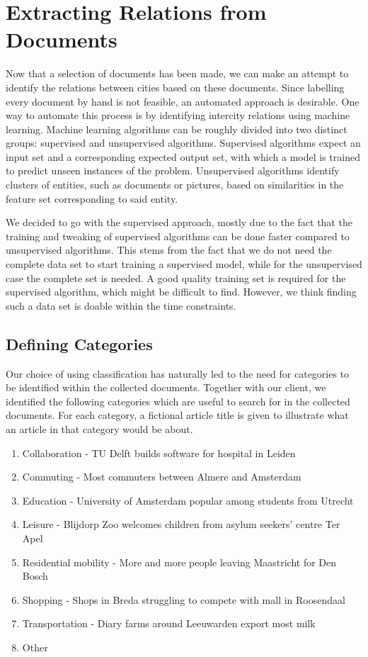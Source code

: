 \section{Extracting Relations from Documents}\label{sec:classification-design}
Now that a selection of documents has been made, we can make an attempt to identify the relations between cities based on these documents. Since labelling every document by hand is not feasible, an automated approach is desirable. 
One way to automate this process is by identifying intercity relations using machine learning. Machine learning algorithms can be roughly divided into two distinct groups: supervised and unsupervised algorithms. Supervised algorithms expect an input set and a corresponding expected output set, with which a model is trained to predict unseen instances of the problem. Unsupervised algorithms identify clusters of entities, such as documents or pictures, based on similarities in the feature set corresponding to said entity.

We decided to go with the supervised approach, mostly due to the fact that the training and tweaking of supervised algorithms can be done faster compared to unsupervised algorithms. This stems from the fact that we do not need the complete data set to start training a supervised model, while for the unsupervised case the complete set is needed. A good quality training set is required for the supervised algorithm, which might be difficult to find. However, we think finding such a data set is doable within the time constraints.

\subsection{Defining Categories}
Our choice of using classification has naturally led to the need for categories to be identified within the collected documents. Together with our client, we identified the following categories which are useful to search for in the collected documents. For each category, a fictional article title is given to illustrate what an article in that category would be about.\\

\begin{enumerate}
    \item Collaboration - TU Delft builds software for hospital in Leiden
    \item Commuting - Most commuters between Almere and Amsterdam
    \item Education - University of Amsterdam popular among students from Utrecht
    \item Leisure - Blijdorp Zoo welcomes children from asylum seekers' centre Ter Apel
    \item Residential mobility - More and more people leaving Maastricht for Den Bosch
    \item Shopping - Shops in Breda struggling to compete with mall in Roosendaal
    \item Transportation - Diary farms around Leeuwarden export most milk
    \item Other
\end{enumerate}


